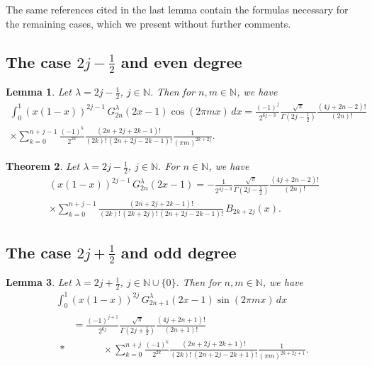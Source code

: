 \documentclass[a4paper,reqno]{amsart}
\newcommand{\N}{\mathbb{N}}
\theoremstyle{plain}
\newtheorem{Teor}{Theorem}[section]
\newtheorem{Lema}[Teor]{Lemma}
\numberwithin{equation}{section}
\theoremstyle{remark}
\begin{document}
The same references cited in the last lemma contain the formulas necessary for the remaining cases, which we present without further comments.

\subsection{The case $2j-\frac{1}{2}$ and even degree}

\begin{Lema} 
Let $\lambda = 2j-\frac{1}{2}$, $j\in \N$. Then for $n,m\in\N$, we have
\begin{multline*}
  \int_0^1 (x(1-x))^{2j-1}\,G_{2n}^\lambda (2x-1) \cos(2\pi mx)\,dx
  = \frac{(-1)^j}{2^{6j-3}} \frac{\sqrt{\pi}}{\Gamma(2j-\frac{1}{2})} \frac{(4j+2n-2)!}{(2n)!}
  \\
  \times
  \sum_{k=0}^{n+j-1} \frac{(-1)^{k}}{2^{2k}} \frac{(2n+2j+2k-1)!}{(2k)!\,(2n+2j-2k-1)!} 
  \frac{1}{(\pi m)^{2k+2j}}.
\end{multline*}
\end{Lema}

\begin{Teor} 
Let $\lambda = 2j-\frac{1}{2}$, $j\in \N$. For $n\in\N$, we have
\begin{multline}
\label{gegen2j-par}
  (x(1-x))^{2j-1}\,G_{2n}^\lambda(2x-1)
  = -\frac{1}{2^{4j-3}} \frac{\sqrt{\pi}}{\Gamma(2j-\frac{1}{2})} \frac{(4j+2n-2)!}{(2n)!}
  \\
  \times
  \sum_{k=0}^{n+j-1} \frac{(2n+2j+2k-1)!}{(2k)!\,(2k+2j)!\,(2n+2j-2k-1)!}\,B_{2k+2j}(x).
\end{multline}
\end{Teor}

\subsection{The case $2j+\frac{1}{2}$ and odd degree}

\begin{Lema} 
Let $\lambda = 2j+ \frac{1}{2}$, $j\in \N\cup\{0\}$. Then for $n,m\in\N$, we have
\begin{multline*}
  \int_0^1 (x(1-x))^{2j}\,G_{2n+1}^\lambda (2x-1) \sin(2\pi mx)\,dx
  \\
  \begin{aligned}
  &= \frac{(-1)^{j+1}}{2^{6j}} \frac{\sqrt{\pi}}{\Gamma(2j+ \frac{1}{2})} \frac{(4j+2n+1)!}{(2n+1)!}
  \\*
  &\qquad\quad \times
  \sum_{k=0}^{n+j} \frac{(-1)^{k}}{2^{2k}} \frac{(2n+2j+2k+1)!}{(2k)!\,(2n+2j-2k+1)!} 
  \frac{1}{(\pi m)^{2k+2j+1}}.
  \end{aligned}
\end{multline*}
\end{Lema}
\end{document}
